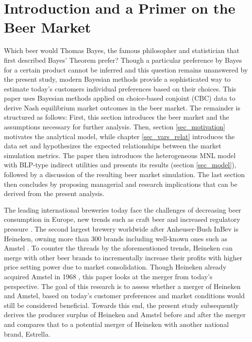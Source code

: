 \documentclass[12pt,a4paper]{article}
\begin{document}
\section{Introduction and a Primer on the Beer Market} \label{sec_intro}
Which beer would Thomas Bayes, the famous philosopher and statistician that first described Bayes' Theorem \citep{bayesEssaySolvingProblem1763} prefer?
Though a particular preference by Bayes for a certain product cannot be inferred and this question remains unanswered by the present study, modern Bayesian methods provide a sophisticated way to estimate today's customers individual preferences based on their choices.
This paper uses Bayesian methods applied on choice-based conjoint (CBC) data to derive Nash equilibrium market outcomes in the beer market.
The remainder is structured as follows: First, this section introduces the beer market and the assumptions necessary for further analysis.
Then, section \ref{sec_motivation} motivates the analytical model, while chapter \ref{sec_vars_relat} introduces the data set and hypothesizes the expected relationships between the market simulation metrics.
The paper then introduces the heterogeneous MNL model with BLP-type indirect utilities and presents its results (section \ref{sec_model}), followed by a discussion of the resulting beer market simulation.
The last section then concludes by proposing managerial and research implications that can be derived from the present analysis.

The leading international breweries today face the challenges of decreasing beer consumption in Europe, new trends such as craft beer and increased regulatory pressure \citep{jpmorganWhatTapGlobal2018}.
The second largest brewery worldwide after Anheuser-Bush InBev is Heineken, owning more than 300 brands including well-known ones such as Amstel \citep{heinekenHeinekenAnnualReport2019}.
To counter the threads by the aforementioned trends, Heineken can merge with other beer brands to incrementally increase their profits with higher price setting power due to market consolidation.
Though Heineken already acquired Amstel in 1968 \citep[p. 49]{oliverOxfordCompanionBeer2011}, this paper looks at the merger from today's perspective.
The goal of this research is to assess whether a merger of Heineken and Amstel, based on today's customer preferences and market conditions would still be considered beneficial.
Towards this end, the present study subsequently derives the producer surplus of Heineken and Amstel before and after the merger and compares that to a potential merger of Heineken with another national brand, Estrella.
\end{document}
